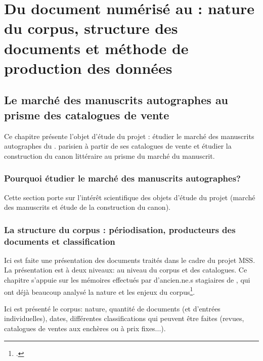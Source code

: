 
\part{Du document numérisé au \xmltei: nature du corpus, structure des documents et méthode de production des données}
\chapter{Le marché des manuscrits autographes au prisme des catalogues de vente}
Ce chapitre présente l'objet d'étude du projet \mss{} : étudier le marché des manuscrits autographes du . parisien à partir de ses catalogues de vente et étudier la construction du canon littéraire au prisme du marché du manuscrit.

\section{Pourquoi étudier le marché des manuscrits autographes?}
Cette section porte sur l'intérêt scientifique des objets d'étude du projet (marché des manuscrits et étude de la construction du canon).


\section{La structure du corpus : périodisation, producteurs des documents et classification}
Ici est faite une présentation des documents traités dans le cadre du projet MSS. La présentation est à deux niveaux: au niveau du corpus et des catalogues. Ce chapitre s'appuie sur les mémoires effectués par d'ancien.ne.s stagiaires de \ktb{}, qui ont déjà beaucoup analysé la nature et les enjeux du corpus\footcite{rondeau_du_noyer_encoder_2019, corbieres_du_2020, janes_du_2021}.

Ici est présenté le corpus: nature, quantité de documents (et d'entrées individuelles), dates, différentes classifications qui peuvent être faites (revues, catalogues de ventes aux enchères ou à prix fixes...).

